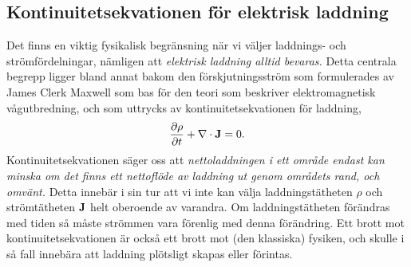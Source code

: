 \subsection{Kontinuitetsekvationen f{\"o}r elektrisk laddning}
Det finns en viktig fysikalisk begr{\"a}nsning n{\"a}r vi v{\"a}ljer laddnings-
och str{\"o}mf{\"o}rdelningar, n{\"a}mligen att {\it elektrisk laddning alltid
bevaras.}  Detta centrala begrepp ligger bland
annat bakom den f{\"o}rskjut\-nings\-str{\"o}m
som formulerades av James Clerk Maxwell 
som bas f{\"o}r den teori som beskriver elektromagnetisk v{\aa}gutbredning, och
som uttrycks av kontinuitetsekvationen f{\"o}r laddning,
$$
  {{\partial\rho}\over{\partial t}}+\nabla\cdot{\bf J}=0.
$$
Kontinuitetsekvationen s{\"a}ger oss att {\it nettoladdningen i ett omr{\aa}de
endast kan minska om det finns ett nettofl{\"o}de av laddning ut genom
omr{\aa}dets rand, och omv{\"a}nt.}
Detta inneb{\"a}r i sin tur att vi inte kan v{\"a}lja laddningst{\"a}theten
$\rho$ och str{\"o}mt{\"a}theten ${\bf J}$ helt oberoende av varandra.
Om laddningst{\"a}theten f{\"o}r{\"a}ndras med tiden s{\aa} m{\aa}ste
str{\"o}mmen vara f{\"o}renlig med denna f{\"o}r{\"a}ndring.
Ett brott mot kontinuitetsekvationen {\"a}r ocks{\aa} ett brott mot (den
klassiska) fysiken, och skulle i s{\aa} fall inneb{\"a}ra att laddning
pl{\"o}tsligt skapas eller f{\"o}rintas.

